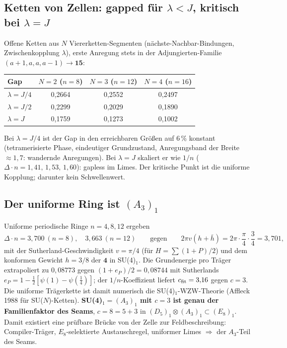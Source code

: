 \subsection{Ketten von Zellen: gapped für $\lambda<J$, kritisch bei $\lambda=J$}
Offene Ketten aus $N$ Viererketten-Segmenten (nächste-Nachbar-Bindungen, Zwischenkopplung $\lambda$), erste Anregung stets in der Adjungierten-Familie $(a{+}1,a,a,a{-}1)\to\mathbf{15}$:
\begin{center}
\begin{tabular}{@{}lccc@{}}\toprule
Gap & $N=2$ ($n=8$) & $N=3$ ($n=12$) & $N=4$ ($n=16$)\\\midrule
$\lambda=J/4$ & 0{,}2664 & 0{,}2552 & 0{,}2497\\
$\lambda=J/2$ & 0{,}2299 & 0{,}2029 & 0{,}1890\\
$\lambda=J$ & 0{,}1759 & 0{,}1273 & 0{,}1002\\\bottomrule
\end{tabular}
\end{center}
Bei $\lambda=J/4$ ist der Gap in den erreichbaren Größen auf 6\,\% konstant (tetramerisierte Phase, eindeutiger Grundzustand, Anregungsband der Breite $\approx1{,}7$: wandernde Anregungen). Bei $\lambda=J$ skaliert er wie $1/n$ ($\Delta\cdot n=1{,}41,\,1{,}53,\,1{,}60$): gapless im Limes. Der kritische Punkt ist die uniforme Kopplung; darunter kein Schwellenwert.

\subsection{Der uniforme Ring ist $(A_3)_1$}
Uniforme periodische Ringe $n=4,8,12$ ergeben
\[
\Delta\cdot n=3{,}700\ (n{=}8),\quad 3{,}663\ (n{=}12)\qquad\text{gegen}\qquad 2\pi v(h+\bar h)=2\pi\cdot\frac{\pi}{4}\cdot\frac34=3{,}701,
\]
mit der Sutherland-Geschwindigkeit $v=\pi/4$ (für $H=\sum(1+P)/2$) und dem konformen Gewicht $h=3/8$ der $\mathbf 4$ in SU(4)$_1$. Die Grundenergie pro Träger extrapoliert zu $0{,}08773$ gegen $(1+e_P)/2=0{,}08744$ mit Sutherlands $e_P=1-\tfrac12[\psi(1)-\psi(\tfrac14)]$; der $1/n$-Koeffizient liefert $c_{\rm fit}=3{,}16$ gegen $c=3$. Die uniforme Trägerkette ist damit numerisch die SU(4)$_1$-WZW-Theorie (Affleck 1988 für SU($N$)-Ketten). \textbf{SU(4)$_1=(A_3)_1$ mit $c=3$ ist genau der Familienfaktor des Seams}, $c=8=5+3$ in $(D_5)_1\otimes(A_3)_1\subset(E_8)_1$. Damit existiert eine prüfbare Brücke von der Zelle zur Feldbeschreibung: Compiler-Träger, $E_8$-selektierte Austauschregel, uniformer Limes $\Rightarrow$ der $A_3$-Teil des Seams.

